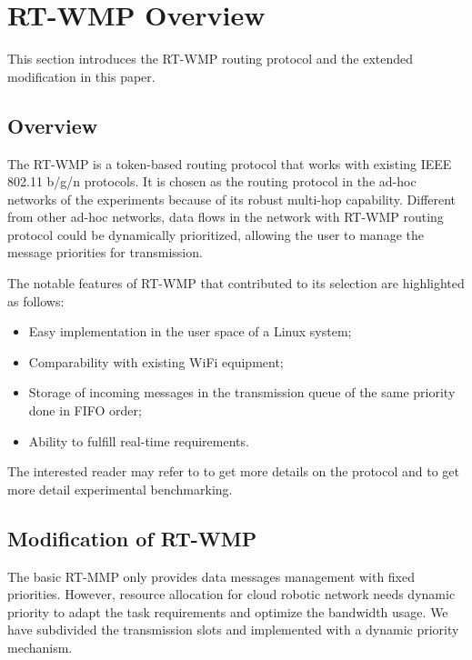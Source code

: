 \documentclass[journal]{IEEEtran}  %
\begin{document}
\section{RT-WMP Overview}
This section introduces the RT-WMP routing protocol and 
 the extended modification in this paper. 

\subsection{Overview}
The RT-WMP is a token-based routing protocol that works with existing IEEE
802.11 b/g/n protocols. It is chosen as the routing protocol in the ad-hoc
networks of the experiments because of its robust multi-hop capability.
Different from other ad-hoc networks, data flows in the network with
RT-WMP routing protocol could be dynamically prioritized, allowing the
user to manage the message priorities for transmission. 

The notable features of RT-WMP that contributed to its
selection are highlighted as follows:

\begin{itemize}
\item 
 Easy implementation in the user space of a Linux system;
\item
 Comparability with existing WiFi equipment;
 \item
 Storage of incoming messages in the transmission queue
of the same priority done in FIFO order;
\item
 Ability to fulfill real-time requirements.
\end{itemize}

The interested reader may refer to \cite{Danilo07rtwmp} to get more
details on the protocol and \cite{tan2013icia} to get more detail
experimental benchmarking.

\subsection{Modification of RT-WMP}
The basic RT-MMP only provides data messages management with fixed
priorities.
However, resource allocation for cloud robotic network needs dynamic
priority to adapt the task requirements and optimize the bandwidth usage. 
We have subdivided the transmission slots and implemented with
a dynamic priority mechanism. 

\end{document}
